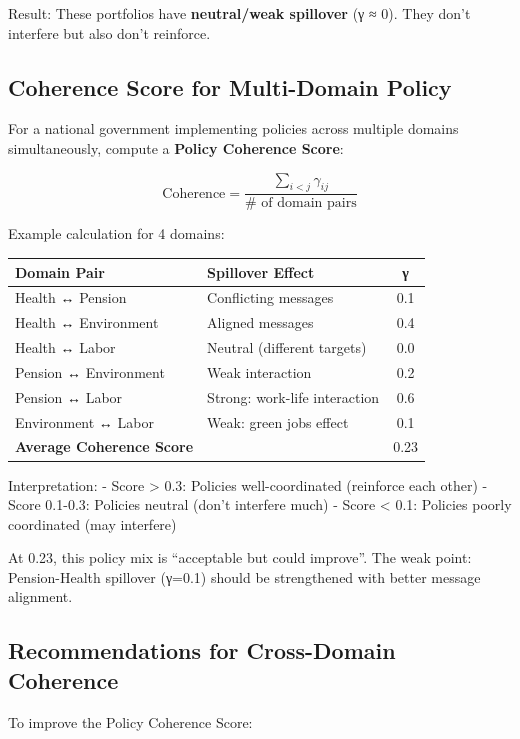 Result: These portfolios have \textbf{neutral/weak spillover} (γ ≈ 0). They don't interfere but also don't reinforce.

\subsection{Coherence Score for Multi-Domain Policy}

For a national government implementing policies across multiple domains simultaneously, compute a \textbf{Policy Coherence Score}:

$$\text{Coherence} = \frac{\sum_{i < j} \gamma_{ij}}{\text{# of domain pairs}}$$

Example calculation for 4 domains:

\begin{center}
\begin{tabular}{@{}llc@{}}
\toprule
\textbf{Domain Pair} & \textbf{Spillover Effect} & \textbf{γ} \\
\midrule
Health ↔ Pension & Conflicting messages & 0.1 \\
Health ↔ Environment & Aligned messages & 0.4 \\
Health ↔ Labor & Neutral (different targets) & 0.0 \\
Pension ↔ Environment & Weak interaction & 0.2 \\
Pension ↔ Labor & Strong: work-life interaction & 0.6 \\
Environment ↔ Labor & Weak: green jobs effect & 0.1 \\
\midrule
\textbf{Average Coherence Score} & & 0.23 \\
\midrule
\end{tabular}
\end{center}

Interpretation:
- Score > 0.3: Policies well-coordinated (reinforce each other)
- Score 0.1-0.3: Policies neutral (don't interfere much)
- Score < 0.1: Policies poorly coordinated (may interfere)

At 0.23, this policy mix is ``acceptable but could improve''. The weak point: Pension-Health spillover (γ=0.1) should be strengthened with better message alignment.

\subsection{Recommendations for Cross-Domain Coherence}

To improve the Policy Coherence Score:

